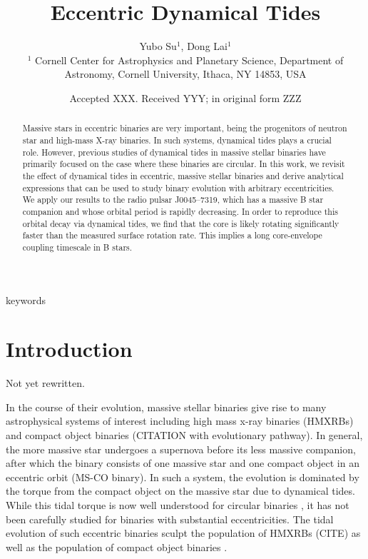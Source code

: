 \documentclass[
        fleqn,
        usenatbib,
    ]{mnras}
\title[Eccentric Dynamical Tides]{Eccentric Dynamical Tides}
\author[Y. Su, D. Lai.]{
Yubo Su$^1$,
Dong Lai$^1$
\\
$^1$ Cornell Center for Astrophysics and Planetary Science, Department of
Astronomy, Cornell University, Ithaca, NY 14853, USA
}
\date{Accepted XXX\@. Received YYY\@; in original form ZZZ}
\begin{document}
\label{firstpage}
\pagerange{\pageref{firstpage}--\pageref{lastpage}}
\maketitle

\begin{abstract}
    Massive stars in eccentric binaries are very important, being the progenitors
    of neutron star and high-mass X-ray binaries. In such systems, dynamical
    tides plays a crucial role. However, previous studies of dynamical tides in
    massive stellar binaries have primarily focused on the case where these
    binaries are circular. In this work, we revisit the effect of dynamical
    tides in eccentric, massive stellar binaries and derive analytical
    expressions that can be used to study binary evolution with arbitrary
    eccentricities. We apply our results to the radio pulsar J0045--7319, which
    has a massive B star companion and whose orbital period is rapidly
    decreasing. In order to reproduce this orbital decay via dynamical tides, we
    find that the core is likely rotating significantly faster than the measured
    surface rotation rate. This implies a long core-envelope coupling timescale
    in B stars.
\end{abstract}

\begin{keywords}
keywords
\end{keywords}

\section{Introduction}

\textcolor{Corr}{Not yet rewritten.}

In the course of their evolution, massive stellar binaries give rise to many
astrophysical systems of interest including high mass x-ray binaries (HMXRBs)
and compact object binaries (CITATION with evolutionary pathway). In general,
the more massive star undergoes a supernova before its less massive companion,
after which the binary consists of one massive star and one compact object in an
eccentric orbit (MS-CO binary). In such a system, the evolution is dominated by
the torque from the compact object on the massive star due to dynamical tides.
While this tidal torque is now well understood for circular binaries
\citep{kushnir}, it has not been carefully studied for binaries with substantial
eccentricities. The tidal evolution of such eccentric binaries sculpt the
population of HMXRBs (CITE) as well as the population of compact object binaries
\citep{vigna2020common}.
\end{document}
